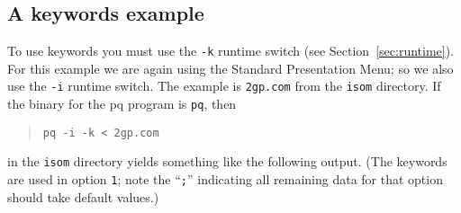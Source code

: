 \documentclass[12pt]{article}
\begin{document}
\subsection{A keywords example}

To use keywords you must use the \texttt{-k} runtime switch
(see Section~\ref{sec:runtime}). For this example we are again
using the Standard Presentation Menu; so we also use the \texttt{-i} runtime
switch. The example is \verb|2gp.com| from the \texttt{isom} directory.
If the binary for the pq program is \texttt{pq}, then
\begin{quote}
 \verb|pq -i -k < 2gp.com|
\end{quote}
in the \texttt{isom} directory yields something like the following output.
(The keywords are used in option \texttt{1}; note the ``\texttt{;}'' 
indicating all remaining data for that option should take default values.)
\end{document}
